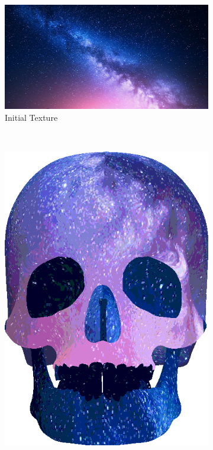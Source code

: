 \begin{figure}[h]
    \centering
        \begin{subfigure}[b]{0.4\textwidth}
        \includegraphics[width=\textwidth]{img/textures/space.png}
        \caption{Initial Texture}
        \label{fig:Space}
    \end{subfigure}
~
\hspace{24pt}
~
    \centering
    \begin{subfigure}[b]{0.18\textwidth}
        \includegraphics[width=\textwidth]{img/textures/TextureReplacementSkull.png}

\end{subfigure}
\end{figure}
